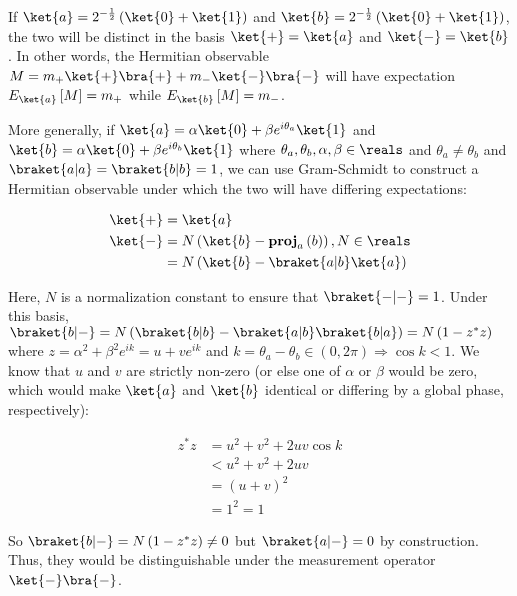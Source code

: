 \par If $\ket{a} = 2^{-\frac{1}{2}} \left( \ket{0} + \ket{1} \right)$ and
$\ket{b} = 2^{-\frac{1}{2}} \left( \ket{0} + \ket{1} \right)$, the two will be
distinct in the basis $\ket{+} = \ket{a}$ and $\ket{-} = \ket{b}$. In other
words, the Hermitian observable $M = m_{+} \ket{+} \bra{+} + m_{-} \ket{-}
\bra{-}$ will have expectation $E_{\ket{a}} \left[ M \right] = m_{+}$ while
$E_{\ket{b}} \left[ M \right] = m_{-}$.

\par More generally, if $\ket{a} = \alpha \ket{0} + \beta e^{i \theta_a}
\ket{1}$ and $\ket{b} = \alpha \ket{0} + \beta e^{i \theta_b} \ket{1}$ where
$\theta_a, \theta_b, \alpha, \beta \in \reals$ and $\theta_a \ne \theta_b$ and
$\braket{a|a} = \braket{b|b} = 1$, we can use Gram-Schmidt to construct a
Hermitian observable under which the two will have differing expectations:

\begin{align}
\ket{+} &= \ket{a} \\
\ket{-} &= N \left( \ket{b} - \mathbf{proj}_a \left( b \right) \right), N \in
\reals \\
&= N \left( \ket{b} - \braket{a|b} \ket{a} \right)
\end{align}

Here, $N$ is a normalization constant to ensure that $\braket{-|-} = 1$. Under
this basis, $\braket{b|-} = N \left( \braket{b|b} - \braket{a|b} \braket{b|a}
\right) = N \left( 1 - z^* z \right)$ where $z = \alpha^2 + \beta^2 e^{i k} = u
+ v e^{i k}$ and $k = \theta_a - \theta_b \in \left( 0, 2 \pi \right)
\Rightarrow \cos k < 1$. We know that $u$ and $v$ are strictly non-zero (or else
one of $\alpha$ or $\beta$ would be zero, which would make $\ket{a}$ and
$\ket{b}$ identical or differing by a global phase, respectively):

\begin{align}
z^* z &= u^2 + v^2 + 2 u v \cos k \\
&< u^2 + v^2 + 2 u v \\
&= \left( u + v \right)^2 \\
&= 1^2 = 1
\end{align}

So $\braket{b|-} = N \left( 1 - z^* z \right) \ne 0$ but $\braket{a|-} = 0$ by
construction. Thus, they would be distinguishable under the measurement
operator $\ket{-} \bra{-}$.
